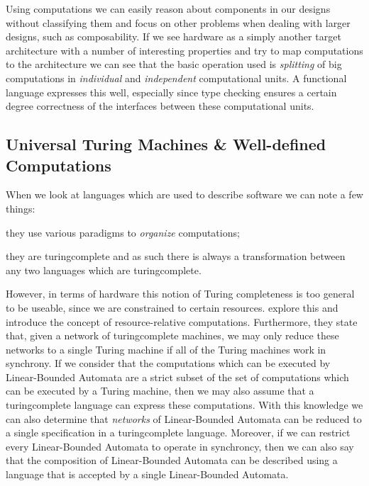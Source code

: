 Using computations we can easily reason about components in our designs without classifying them and focus on other problems when dealing with larger designs, such as composability.
If we see hardware as a simply another target architecture with a number of interesting properties and try to map computations to the architecture we can see that the basic operation used is \textit{splitting} of big computations in \textit{individual} and \textit{independent} computational units.
A functional language expresses this well, especially since type checking ensures a certain degree correctness of the interfaces between these computational units.

\subsection{Universal Turing Machines \& Well-defined Computations}
When we look at languages which are used to describe software we can note a few things: 
\begin{inparaenum}
 \item they use various paradigms to \textit{organize} computations;
 \item they are \gls{turingcomplete} and as such there is always a transformation between any two languages which are \gls{turingcomplete}.
\end{inparaenum}
However, in terms of hardware this notion of Turing completeness is too general to be useable, since we are constrained to certain resources.  
\citeauthor{copeland1999beyond} explore this and introduce the concept of resource-relative computations. 
Furthermore, they state that, given a network of \gls{turingcomplete} machines, we may only reduce these networks to a single Turing machine if all of the Turing machines work in synchrony.
If we consider that the computations which can be executed by Linear-Bounded Automata  are a strict subset of the set of computations which can be executed by a Turing machine, then we may also assume that a \gls{turingcomplete} language can express these computations.
With this knowledge we can also determine that \textit{networks} of Linear-Bounded Automata can be reduced to a single specification in a \gls{turingcomplete} language.
Moreover, if we can restrict every Linear-Bounded Automata to operate in synchroncy, then we can also say that the composition of Linear-Bounded Automata can be described using a language that is accepted by a single Linear-Bounded Automata.

